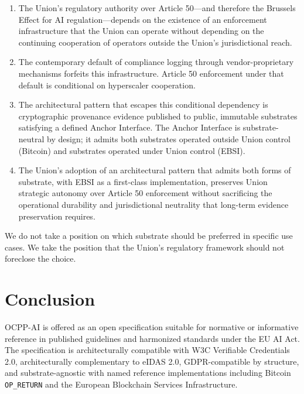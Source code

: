 \documentclass[11pt,a4paper]{article}
\begin{document}
\begin{enumerate}[leftmargin=1.6em]
\item The Union's regulatory authority over Article 50---and therefore the Brussels Effect for AI regulation---depends on the existence of an enforcement infrastructure that the Union can operate without depending on the continuing cooperation of operators outside the Union's jurisdictional reach.

\item The contemporary default of compliance logging through vendor-proprietary mechanisms forfeits this infrastructure. Article 50 enforcement under that default is conditional on hyperscaler cooperation.

\item The architectural pattern that escapes this conditional dependency is cryptographic provenance evidence published to public, immutable substrates satisfying a defined Anchor Interface. The Anchor Interface is substrate-neutral by design; it admits both substrates operated outside Union control (Bitcoin) and substrates operated under Union control (EBSI).

\item The Union's adoption of an architectural pattern that admits both forms of substrate, with EBSI as a first-class implementation, preserves Union strategic autonomy over Article 50 enforcement without sacrificing the operational durability and jurisdictional neutrality that long-term evidence preservation requires.
\end{enumerate}

We do not take a position on which substrate should be preferred in specific use cases. We take the position that the Union's regulatory framework should not foreclose the choice.

\section{Conclusion}

OCPP-AI is offered as an open specification suitable for normative or informative reference in published guidelines and harmonized standards under the EU AI Act. The specification is architecturally compatible with W3C Verifiable Credentials 2.0, architecturally complementary to eIDAS 2.0, GDPR-compatible by structure, and substrate-agnostic with named reference implementations including Bitcoin \texttt{OP\_RETURN} and the European Blockchain Services Infrastructure.
\end{document}
